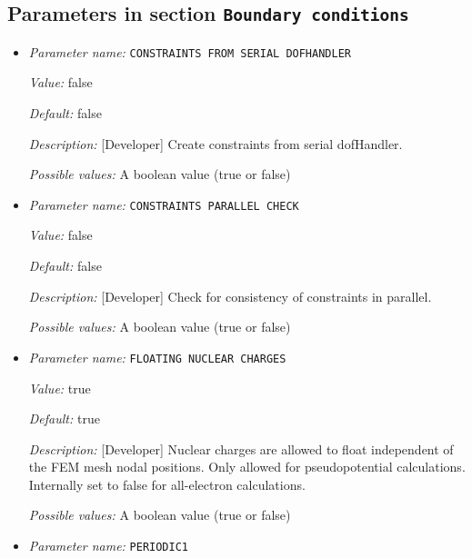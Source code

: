 \subsection{Parameters in section \tt Boundary conditions}
\label{parameters:Boundary_20conditions}

\begin{itemize}
\item {\it Parameter name:} {\tt CONSTRAINTS FROM SERIAL DOFHANDLER}
\label{parameters:Boundary conditions/CONSTRAINTS FROM SERIAL DOFHANDLER}
\label{parameters:Boundary_20conditions/CONSTRAINTS_20FROM_20SERIAL_20DOFHANDLER}


{\it Value:} false


{\it Default:} false


{\it Description:} [Developer] Create constraints from serial dofHandler.


{\it Possible values:} A boolean value (true or false)
\item {\it Parameter name:} {\tt CONSTRAINTS PARALLEL CHECK}
\label{parameters:Boundary conditions/CONSTRAINTS PARALLEL CHECK}
\label{parameters:Boundary_20conditions/CONSTRAINTS_20PARALLEL_20CHECK}


{\it Value:} false


{\it Default:} false


{\it Description:} [Developer] Check for consistency of constraints in parallel.


{\it Possible values:} A boolean value (true or false)
\item {\it Parameter name:} {\tt FLOATING NUCLEAR CHARGES}
\label{parameters:Boundary conditions/FLOATING NUCLEAR CHARGES}
\label{parameters:Boundary_20conditions/FLOATING_20NUCLEAR_20CHARGES}


{\it Value:} true


{\it Default:} true


{\it Description:} [Developer] Nuclear charges are allowed to float independent of the FEM mesh nodal positions. Only allowed for pseudopotential calculations. Internally set to false for all-electron calculations.


{\it Possible values:} A boolean value (true or false)
\item {\it Parameter name:} {\tt PERIODIC1}
\label{parameters:Boundary conditions/PERIODIC1}
\label{parameters:Boundary_20conditions/PERIODIC1}



\end{itemize}
